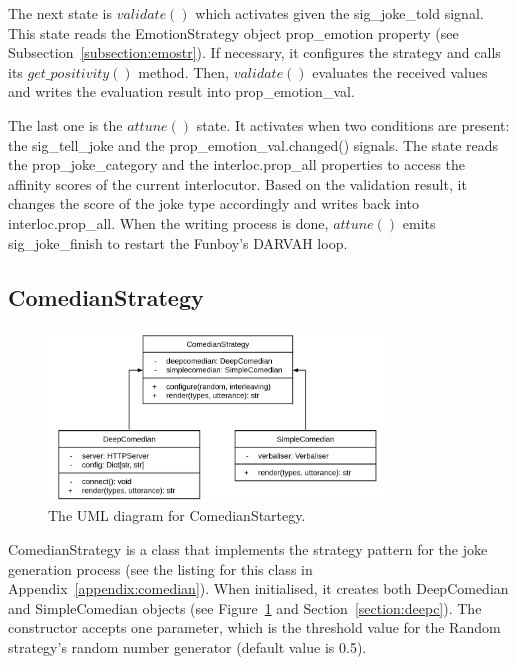 The next state is \( validate()\) which activates given the sig\_joke\_told signal. This state reads the EmotionStrategy object prop\_emotion property (see Subsection~\ref{subsection:emostr}). If necessary, it configures the strategy and calls its \(get\_positivity()\) method. Then, \( validate()\) evaluates the received values and writes the evaluation result into prop\_emotion\_val.

The last one is the \(attune()\) state. It activates when two conditions are present: the sig\_tell\_joke and the prop\_emotion\_val.changed() signals. The state reads the prop\_joke\_category and the interloc.prop\_all properties to access the affinity scores of the current interlocutor. Based on the validation result, it changes the score of the joke type accordingly and writes back into interloc.prop\_all. When the writing process is done, \(attune()\) emits sig\_joke\_finish to restart the Funboy's DARVAH loop.

\subsection{ComedianStrategy}\label{subsection:comstr}

\begin{figure}[htpb]
  \centering
  \includegraphics[width=0.8\textwidth]{figures/umlcomstr.png}
  \caption{The UML diagram for ComedianStartegy.} \label{fig:umlcs}
\end{figure}

ComedianStrategy is a class that implements the strategy pattern for the joke generation process (see the listing for this class in Appendix~\ref{appendix:comedian}). When initialised, it creates both DeepComedian and SimpleComedian objects (see Figure~\ref{fig:umlcs} and Section~\ref{section:deepc}). The constructor accepts one parameter, which is the threshold value for the Random strategy's random number generator (default value is 0.5).

